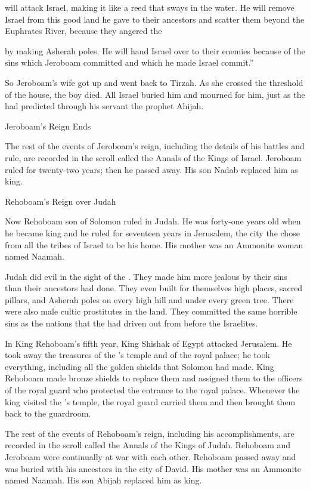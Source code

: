 {{}
will attack
Israel,
making it like
a reed
that sways
in the water.
He will remove
Israel
from this
good
land
he gave
to their ancestors
and scatter
them beyond
the Euphrates
River, because
they angered
the

{}
by making
Asherah poles.
He will hand
Israel
over to their enemies
because of the sins
which
Jeroboam
committed
and which
he made Israel
commit.”
\par }{\PP {}So Jeroboam’s
wife
got up
and went back
to Tirzah.
As she crossed
the threshold
of the house,
the boy
died.
All
Israel
buried
him and mourned
for him, just
as the
{}
had
predicted
through
his servant
the prophet
Ahijah.
\par }{\SH Jeroboam’s Reign Ends
\par }{\PP {}The rest
of the events
of Jeroboam’s
reign, including
the details of his battles
and rule,
are recorded
in the scroll
called the Annals
of the Kings
of Israel.
Jeroboam
ruled
for twenty-two
years;
then he passed away.
His son
Nadab
replaced
him as king.
\par }{\SH Rehoboam’s Reign over Judah
\par }{\PP {}Now Rehoboam
son
of Solomon
ruled
in Judah.
He was forty-one
years
old
when he
became king
and he ruled
for seventeen
years
in Jerusalem,
the city
the {}
chose
from
all
the tribes
of Israel
to be
his home.
His mother
was an Ammonite
woman named
Naamah.
\par }{\PP {}Judah
did
evil
in the sight
of the
{}. They made him more jealous
by their sins
than
their ancestors
had
done.
They even
built
for themselves
high places,
sacred pillars,
and Asherah poles
on
every
high
hill
and under
every
green
tree.
There were also
male cultic prostitutes
in the land.
They committed
the same horrible
sins as the nations
that
the {}
had driven
out from before
the Israelites.
\par }{\PP {}In King
Rehoboam’s
fifth
year,
King
Shishak
of Egypt
attacked Jerusalem.
He took
away the treasures
of the
{}’s
temple
and of the royal
palace;
he took
everything,
including all
the golden
shields
that
Solomon
had made.
King
Rehoboam
made
bronze
shields
to replace
them and assigned
them to the officers
of the royal guard
who protected
the entrance
to the royal
palace.
Whenever
the king
visited
the
{}’s
temple,
the royal guard
carried
them and then brought
them back
to
the guardroom.
\par }{\PP {}The rest
of the events
of Rehoboam’s
reign, including
his accomplishments,
are recorded
in the scroll
called the Annals
of the Kings
of Judah.
Rehoboam
and Jeroboam
were continually
at
war
with each other.
Rehoboam
passed away
and was buried
with
his ancestors
in the city
of David.
His mother
was an Ammonite
named
Naamah.
His son
Abijah
replaced
him as king.

}
